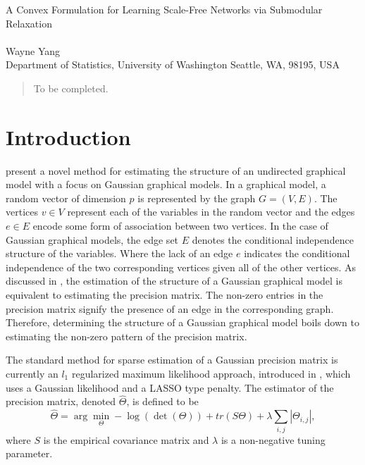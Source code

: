 \documentclass{uwstat572}
\theoremstyle{remark}
\theoremstyle{definition}
\begin{document}

\begin{center}
  {\LARGE A Convex Formulation for Learning Scale-Free Networks via Submodular Relaxation}\\\ \\
  {Wayne Yang \\ 
    Department of Statistics, University of Washington Seattle, WA, 98195, USA
  }
\end{center}



\begin{abstract}
  To be completed.
\end{abstract}

\section{Introduction}
\citet{Defazio2012} present a novel method for estimating the structure of an undirected graphical model with a focus on Gaussian graphical models. In a graphical model, a random vector of dimension $p$ is represented by the graph $G = (V,E)$.  The vertices $v \in V$ represent each of the variables in the random vector and the edges $e \in E$ encode some form of association between two vertices. In the case of Gaussian graphical models, the edge set $E$ denotes the conditional independence structure of the variables.  Where the lack of an edge $e$ indicates the conditional independence of the two corresponding vertices given all of the other vertices.  As discussed in \cite{dempster}, the estimation of the structure of a Gaussian graphical model is equivalent to estimating the precision matrix.  The non-zero entries in the precision matrix signify the presence of an edge in the corresponding graph.  
Therefore, determining the structure of a Gaussian graphical model boils down to 
estimating the non-zero pattern of the precision matrix. 

The standard method for sparse estimation of a Gaussian precision matrix is currently an $l_1$ regularized maximum likelihood approach, introduced in \cite{Yuan2007}, which uses a Gaussian likelihood and a LASSO type penalty.  The estimator of the precision matrix, denoted $\widehat{\Theta}$, is defined to be
\begin{equation}\label{glasso}
    \widehat{\Theta} = \arg\min_{\Theta} -\log( \det( \Theta)) + tr(S \Theta) + \lambda \sum_{i, j} |\Theta_{i,j}|,
\end{equation}
where $S$ is the empirical covariance matrix and $\lambda$ is a non-negative tuning parameter. 
\end{document}
